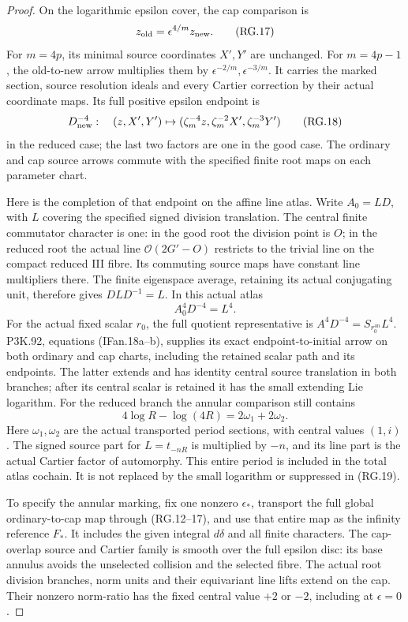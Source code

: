 \begin{proof}
On the logarithmic epsilon cover, the cap comparison is
\[
 z_{\rm old}=\epsilon^{4/m}z_{\rm new}.
                                                        \tag{RG.17}
\]
For \(m=4p\), its minimal source coordinates \(X',Y'\) are
unchanged. For \(m=4p-1\), the old-to-new arrow multiplies
them by \(\epsilon^{-2/m},\epsilon^{-3/m}\). It carries the
marked section, source resolution ideals and every Cartier
correction by their actual coordinate maps. Its full positive
epsilon endpoint is
\[
 D_{\rm new}^{-4}:\quad
 (z,X',Y')\mapsto
 (\zeta_m^{-4}z,\zeta_m^{-2}X',\zeta_m^{-3}Y')
                                                        \tag{RG.18}
\]
in the reduced case; the last two factors are one in the good
case. The ordinary and cap source arrows commute with the
specified finite root maps on each parameter chart.

Here is the completion of that endpoint on the affine line
atlas. Write \(A_0=L D\), with \(L\) covering the specified
signed division translation. The central finite commutator
character is one: in the good root the division point is \(O\);
in the reduced root the actual line
\(\mathcal O(2G'-O)\) restricts to the trivial line on the
compact reduced III fibre. Its commuting source maps have
constant line multipliers there. The finite eigenspace
average, retaining its actual conjugating unit, therefore
gives \(DLD^{-1}=L\). In this actual atlas
\[
                         A_0^4D^{-4}=L^4.
                                                        \tag{RG.19}
\]
For the actual fixed scalar \(r_0\), the full quotient
representative is \(A^4D^{-4}=S_{r_0^{4n}}L^4\).
P3K.92, equations (IFan.18a--b), supplies its exact
endpoint-to-initial arrow on both ordinary and cap charts,
including the retained scalar path and its endpoints.
The latter extends and has identity central source translation
in both branches; after its central scalar is retained it has
the small extending Lie logarithm. For the reduced branch the
annular comparison still contains
\[
                    4\log R-\log(4R)=2\omega_1+2\omega_2.
                                                        \tag{RG.20}
\]
Here \(\omega_1,\omega_2\) are the actual transported period
sections, with central values \((1,i)\). The signed source part
for \(L=t_{-nR}\) is multiplied by \(-n\), and its line
part is the actual Cartier factor of automorphy. This entire
period is included in the total atlas cochain. It is not
replaced by the small logarithm or suppressed in (RG.19).

To specify the annular marking, fix one nonzero
\(\epsilon_*\), transport the full global ordinary-to-cap
map through (RG.12--17), and use that entire map as the
infinity reference \(F_*\). It includes the given integral
\(d\delta\) and all finite characters. The cap-overlap source
and Cartier family is smooth over the full epsilon disc:
its base annulus avoids the unselected collision and the
selected fibre. The actual root division branches, norm
units and their equivariant line lifts extend on the cap.
Their nonzero norm-ratio has the fixed central value \(+2\)
or \(-2\), including at \(\epsilon=0\).


\end{proof}
